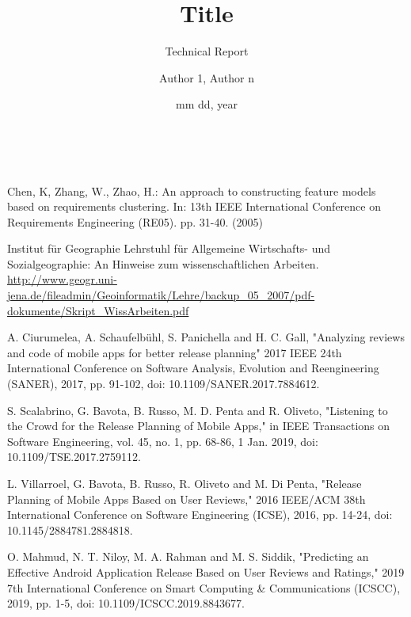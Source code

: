 \documentclass[a4paper,10pt, bibliography=totocnumbered]{scrreprt}
\author{Author 1, Author n}
\title{Title }
\subtitle{Technical Report}
\date{mm dd, year}
\makeatletter
\renewcommand{\maketitle}{\begin{titlepage}
    \vskip 10\p@
    \hbox{
      \vrule depth 0.99\textheight
        \mbox{\hspace{2em}}
      \vtop{
        \vskip 10\p@
        \hspace{4pt}
        \vskip 50\p@
        \begin{flushleft}
          \Large \@author \par
        \end{flushleft}
        \vskip 50\p@
        \begin{flushleft}
          \huge \bfseries \@title \par
        \end{flushleft}
        \begin{flushleft}
          \Large \bfseries \@subtitle \par
        \end{flushleft}
        \vskip 70\p@
        \begin{flushleft}
          \Large \@publishers \par
        \end{flushleft}
        \vskip 50\p@
        \begin{flushleft}
          \Large \@date \par
        \end{flushleft}
        }}
  \end{titlepage}
}
\makeatother
\begin{document}
\maketitle



\tableofcontents








\begin{thebibliography}{9}

 Chen, K, Zhang, W., Zhao, H.: An approach to constructing feature models based on requirements clustering.
In: 13th IEEE International Conference on Requirements Engineering (RE05). pp. 31-40. (2005)

 Institut für Geographie   
Lehrstuhl für Allgemeine Wirtschafts- und Sozialgeographie: An Hinweise zum wissenschaftlichen Arbeiten.
\url{http://www.geogr.uni-jena.de/fileadmin/Geoinformatik/Lehre/backup_05_2007/pdf-dokumente/Skript_WissArbeiten.pdf}

 A. Ciurumelea, A. Schaufelbühl, S. Panichella and H. C. Gall, "Analyzing reviews and code of mobile apps for better release planning" 2017 IEEE 24th International Conference on Software Analysis, Evolution and Reengineering (SANER), 2017, pp. 91-102, doi: 10.1109/SANER.2017.7884612.
  
 S. Scalabrino, G. Bavota, B. Russo, M. D. Penta and R. Oliveto, "Listening to the Crowd for the Release Planning of Mobile Apps," in IEEE Transactions on Software Engineering, vol. 45, no. 1, pp. 68-86, 1 Jan. 2019, doi: 10.1109/TSE.2017.2759112.

L. Villarroel, G. Bavota, B. Russo, R. Oliveto and M. Di Penta, "Release Planning of Mobile Apps Based on User Reviews," 2016 IEEE/ACM 38th International Conference on Software Engineering (ICSE), 2016, pp. 14-24, doi: 10.1145/2884781.2884818.
  
O. Mahmud, N. T. Niloy, M. A. Rahman and M. S. Siddik, "Predicting an Effective Android Application Release Based on User Reviews and Ratings," 2019 7th International Conference on Smart Computing \& Communications (ICSCC), 2019, pp. 1-5, doi: 10.1109/ICSCC.2019.8843677.


\end{thebibliography}
\end{document}
